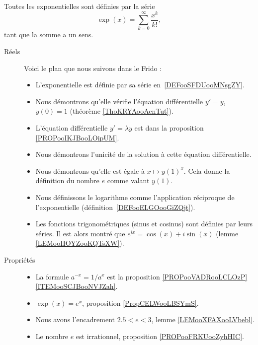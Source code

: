         \label{THEMEooKXSGooCsQNoY}

Toutes les exponentielles sont définies par la série
\begin{equation*}
	\exp(x)=\sum_{k=0}^{\infty}\frac{ x^k }{ k! },
\end{equation*}
tant que la somme a un sens.

\begin{description}
	\item[Réels]

		Voici le plan que nous suivons dans le Frido :
		\begin{itemize}
			\item L'exponentielle est définie par sa série en~\ref{DEFooSFDUooMNsgZY}.
			\item Nous démontrons qu'elle vérifie l'équation différentielle \( y'=y\), \( y(0)=1\) (théorème \ref{ThoKRYAooAcnTut}).
			\item
			      L'équation différentielle \( y'=\lambda y\) est dans la proposition \ref{PROPooIKJBooLOipUM}.
			\item Nous démontrons l'unicité de la solution à cette équation différentielle.
			\item Nous démontrons qu'elle est égale à \( x\mapsto y(1)^x\). Cela donne la définition du nombre \( e\) comme valant \( y(1)\).
			\item Nous définissons le logarithme comme l'application réciproque de l'exponentielle (définition~\ref{DEFooELGOooGiZQjt}).
			\item Les fonctions trigonométriques (sinus et cosinus) sont définies par leurs séries. Il est alors montré que \( e^{ix}=\cos(x)+i\sin(x)\) (lemme \ref{LEMooHOYZooKQTsXW}).
		\end{itemize}

		\item[Propriétés]\hspace{1cm}
		\begin{itemize}
			\item
			      La formule \( a^{-x}=1/a^x\) est la proposition \ref{PROPooVADRooLCLOzP}\ref{ITEMooSCJBooNVJZah}.
			\item
			      \( \exp(x)= e^{x}\), proposition \ref{PropCELWooLBSYmS}.
			\item
			      Nous avons l'encadrement \( 2.5 < e < 3\), lemme \ref{LEMooXFAXooLVbebl}.
			\item
			      Le nombre \( e\) est irrationnel, proposition \ref{PROPooFRKUooZyhHIC}.
		\end{itemize}


\end{description}
